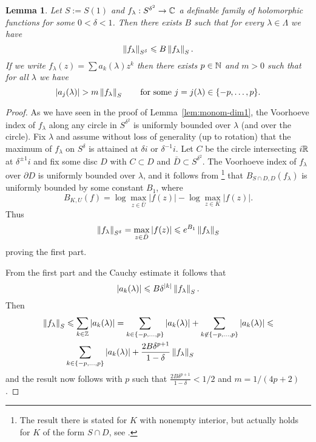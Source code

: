 \documentclass[reqno]{amsart}
\newtheorem{Lem}[Cor]{Lemma}{\bfseries}{\itshape}
\renewcommand\~[1]{\widetilde{#1}}
\begin{document}
\begin{Lem}\label{lem:fourier-bounds}
  Let $S:=S(1)$ and $f_\lambda:S^{\delta^2}\to{\mathbb C}$ a definable family of holomorphic
  functions for some $0<\delta<1$. Then there exists $B$ such that for
  every $\lambda\in\Lambda$ we have
  \begin{equation}
    \left\Vert f_\lambda \right\Vert_{S^\delta} \leqslant B\left\Vert f_\lambda \right\Vert_S.
  \end{equation}
  If we write $f_\lambda(z)=\sum a_k(\lambda)z^k$ then there exists
  $p\in{\mathbb N}$ and $m>0$ such that for all $\lambda$ we have
  \begin{equation}
    |a_j(\lambda)| > m \left\Vert f_\lambda \right\Vert_S\qquad \text{for some } j=j(\lambda)\in\{-p,\ldots,p\}.
  \end{equation}
\end{Lem}
\begin{proof}
  As we have seen in the proof of Lemma~\ref{lem:monom-dim1}, the
  Voorhoeve index of $f_\lambda$ along any circle in $S^{\delta^2}$ is
  uniformly bounded over $\lambda$ (and over the circle). Fix
  $\lambda$ and assume without loss of generality (up to rotation)
  that the maximum of $f_\lambda$ on $S^\delta$ is attained at
  $\delta i$ or $\delta^{-1} i$. Let $C$ be the circle intersecting
  $i{\mathbb R}$ at $\delta^{\pm 1}i$ and fix some disc $D$ with $C\subset D$
  and $\bar D\subset S^{\delta^2}$. The Voorhoeve index of $f_\lambda$
  over $\partial D$ is uniformly bounded over $\lambda$, and it
  follows from \cite[Theorem~3]{ky:rolle}\footnote{The result there is
    stated for $K$ with nonempty interior, but actually holds for $K$
    of the form $S\cap D$, see .}
  that $B_{S\cap D,D}(f_\lambda)$ is uniformly bounded by some
  constant $B_1$, where
  \begin{equation}
    B_{K,U}(f) = \log\max_{z\in\bar U}|f(z)| - \log\max_{z\in K}|f(z)|.
  \end{equation}
  Thus
  \begin{equation}
    \left\Vert f_\lambda \right\Vert_{S^\delta} = \max_{z\in\bar D} |f(z)| \leqslant e^{B_1} \left\Vert f_\lambda \right\Vert_S
  \end{equation}
  proving the first part.

  From the first part and the Cauchy estimate it follows that
  \begin{equation}
    |a_k(\lambda)| \leqslant B \delta^{|k|} \left\Vert f_\lambda \right\Vert_S.
  \end{equation}
  Then
  \begin{align}
    \left\Vert f_\lambda \right\Vert_S &\leqslant \sum_{k\in{\mathbb Z}} |a_k(\lambda)| =
    \sum_{k\in\{-p,\ldots,p\}} |a_k(\lambda)|+\sum_{k\not\in\{-p,\ldots,p\}} |a_k(\lambda)| \leqslant \\
    &\sum_{k\in\{-p,\ldots,p\}} |a_k(\lambda)|+\frac{2B\delta^{p+1}}{1-\delta} \left\Vert f_\lambda \right\Vert_S
  \end{align}
  and the result now follows with $p$ such that
  $\frac{2B\delta^{p+1}}{1-\delta}<1/2$ and $m=1/(4p+2)$.
\end{proof}
\end{document}
